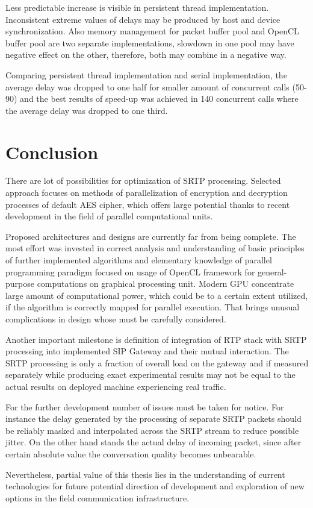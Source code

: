 Less predictable increase is visible in persistent thread implementation.
Inconsistent extreme values of delays may be produced by host and device
synchronization. Also memory management for packet buffer pool and OpenCL
buffer pool are two separate implementations, slowdown in one pool may have
negative effect on the other, therefore, both may combine in a negative way.

Comparing persistent thread implementation and serial implementation, the 
average delay was dropped to one half for smaller amount of concurrent calls
(50-90) and the best results of speed-up was achieved in 140 concurrent calls
where the average delay was dropped to one third.      



\chapter{Conclusion}\label{chapter:conclusion}
There are lot of possibilities for optimization of SRTP processing. Selected
approach focuses on methods of parallelization of encryption and decryption
processes of default AES cipher, which offers large potential thanks to recent
development in the field of parallel computational units.

Proposed architectures and designs are currently far from being complete. The 
most effort was invested in correct analysis and understanding of basic 
principles of further implemented algorithms and elementary knowledge of 
parallel programming paradigm focused on usage of OpenCL framework for
general-purpose computations on graphical processing unit. Modern GPU 
concentrate large amount of computational power, which could be to a certain
extent utilized, if the algorithm is correctly mapped for parallel execution.
That brings unusual complications in design whose must be carefully considered.

Another important milestone is definition of integration of RTP stack with SRTP 
processing into implemented SIP Gateway and their mutual interaction. The SRTP 
processing is only a fraction of overall load on the gateway and if measured 
separately while producing exact experimental results may not be equal to the 
actual results on deployed machine experiencing real traffic. 

For the further development number of issues must be taken for notice. For 
instance the delay generated by the processing of separate SRTP packets should 
be reliably masked and interpolated across the SRTP stream to reduce possible 
jitter. On the other hand stands the actual delay of incoming packet, since
after certain absolute value the conversation quality becomes unbearable.

Nevertheless, partial value of this thesis lies in the understanding of current
technologies for future potential direction of development and exploration of
new options in the field communication infrastructure.



